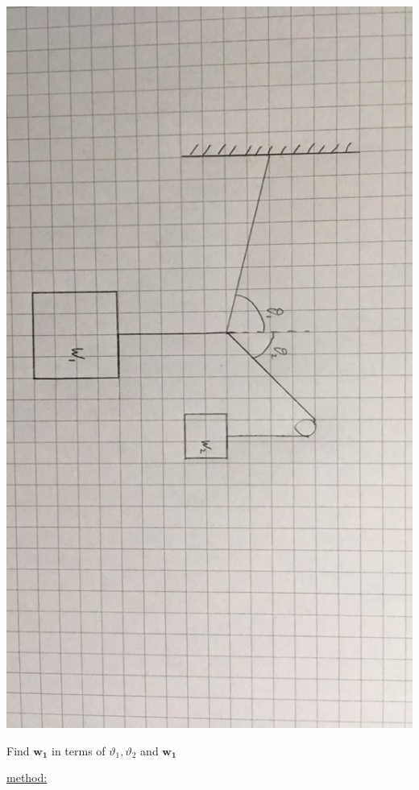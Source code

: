 \documentclass{article}
\renewcommand{\vec}[1]{\bm{#1}}
\newcommand{\vv}[1]{\vec{#1}}
\begin{document}
\includegraphics[scale=0.2, angle=90]{Diagram1}

Find \(\vv{w_1}\) in terms of \(\vartheta_1,\vartheta_2\) and \(\vv{w_1}\)

\underline{method:}
\end{document}
